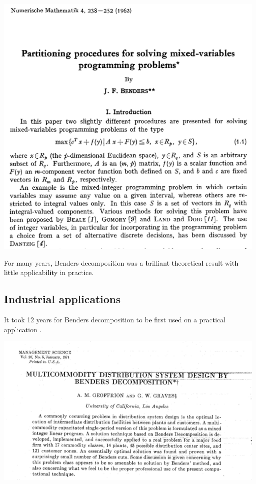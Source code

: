 \begin{center}
\includegraphics[width=14cm]{fig/fig1}
\end{center}


\vspace{1cm}

For many years, Benders decomposition \cite{benders62partitioning}  was a brilliant theoretical result with little applicability in practice. 


\newpage

\subsection*{Industrial applications}


It took 12 years for Benders decomposition to be first used on a practical application  \cite{geoffrion74multicommodity}. 


\begin{center}
\includegraphics[width=14cm]{fig//fig2}
\end{center}


